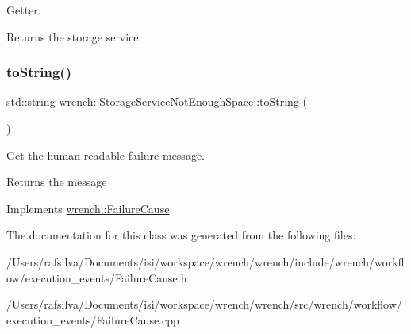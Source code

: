 Getter. 

\begin{DoxyReturn}{Returns}
the storage service 
\end{DoxyReturn}
\mbox{\label{classwrench_1_1_storage_service_not_enough_space_a42680e32c21db44888e173d6a0358326}} 
\subsubsection{\texorpdfstring{to\+String()}{toString()}}
{\footnotesize\ttfamily std\+::string wrench\+::\+Storage\+Service\+Not\+Enough\+Space\+::to\+String (\begin{DoxyParamCaption}{ }\end{DoxyParamCaption})\hspace{0.3cm}{\ttfamily [virtual]}}



Get the human-\/readable failure message. 

\begin{DoxyReturn}{Returns}
the message 
\end{DoxyReturn}


Implements \hyperlink{classwrench_1_1_failure_cause_afbad248ebe902409f2cd4f1d6f2b867d}{wrench\+::\+Failure\+Cause}.



The documentation for this class was generated from the following files\+:\begin{DoxyCompactItemize}
\item 
/\+Users/rafsilva/\+Documents/isi/workspace/wrench/wrench/include/wrench/workflow/execution\+\_\+events/Failure\+Cause.\+h\item 
/\+Users/rafsilva/\+Documents/isi/workspace/wrench/wrench/src/wrench/workflow/execution\+\_\+events/Failure\+Cause.\+cpp\end{DoxyCompactItemize}
